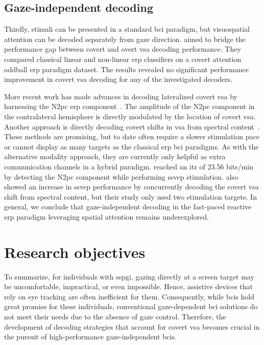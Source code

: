 \subsection{Gaze-independent decoding}
\label{sec:gaze-independence/sota/decoding}

Thirdly, stimuli can be presented in a standard \ac{bci} paradigm, but visuospatial
attention can be decoded separately from gaze direction.
\textcite{Aloise2012} aimed to bridge the performance gap between covert and
overt \ac{vsa} decoding performance.
They compared classical linear and non-linear \ac{erp} classifiers on a covert
attention oddball \ac{erp} paradigm dataset.
The results revealed no significant performance improvement in covert \ac{vsa}
decoding for any of the investigated decoders.

More recent work has made advances in decoding lateralized covert
\ac{vsa} by harnessing the N2pc \ac{erp}
component~\cite{Thiery2016,Reichert2020b,Wang2022}.
The amplitude of the N2pc component in the contralateral hemisphere is directly modulated
by the location of covert \ac{vsa}.
Another approach is directly decoding covert shifts in \ac{vsa} from spectral
content~\cite{Tonin2013}.
These methods are promising, but to date often require a slower stimulation pace or cannot display as
many targets as the classical \ac{erp} \ac{bci} paradigms.
As with the alternative modality approach, they are currently only helpful as
extra communication channels in a hybrid paradigm.
\textcite{Xu2016} reached an \ac{itr} of 23.56 bits/min by detecting the N2pc
component while performing \ac{ssvep} stimulation.
\textcite{Egan2017} also showed an increase in \ac{ssvep} performance by
concurrently decoding the covert \ac{vsa} shift from spectral content, but
their study only used two stimulation targets.
In general, we conclude that gaze-independent decoding in the fast-paced reactive
\ac{erp} paradigm leveraging spatial attention remains underexplored.

\section{Research objectives}
\label{sec:gaze-independence/objectives}

To summarize, for individuals with \ac{sspgi}, gazing directly at a screen target may
be uncomfortable, impractical, or even impossible.
Hence, assistive devices that rely on eye tracking are often inefficient for
them.
Consequently, while \acp{bci} hold great promise for these individuals, conventional
gaze-dependent \ac{bci} solutions do not meet their needs due to the absence of gaze
control.
Therefore, the development of decoding strategies that account for covert
\ac{vsa} becomes crucial in the pursuit of high-performance gaze-independent
\acp{bci}.

